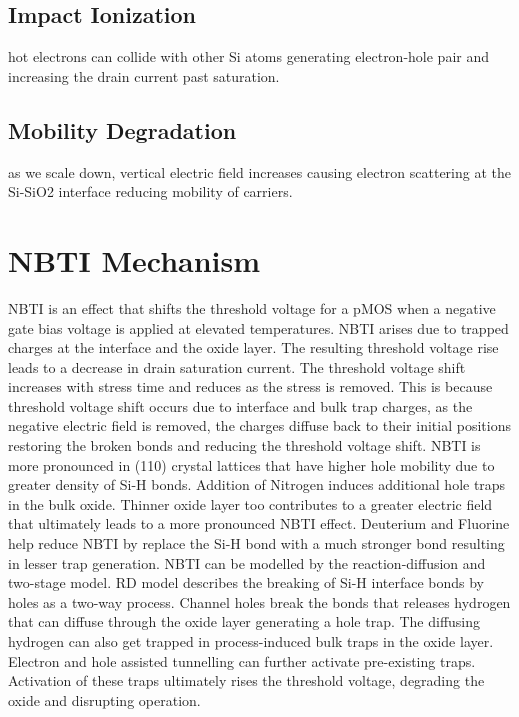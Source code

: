 \subsection{Impact Ionization}
hot electrons can collide with other Si atoms generating electron-hole pair and increasing the drain current past saturation. 
\subsection{Mobility Degradation}
as we scale down, vertical electric field increases causing electron scattering at the Si-SiO2 interface reducing mobility of carriers.
\section{NBTI Mechanism}
NBTI is an effect that shifts the threshold voltage for a pMOS when a negative gate bias voltage is applied at elevated temperatures. NBTI arises due to trapped charges at the interface and the oxide layer. The resulting threshold voltage rise leads to a decrease in drain saturation current. The threshold voltage shift increases with stress time and reduces as the stress is removed. This is because threshold voltage shift occurs due to interface and bulk trap charges, as the negative electric field is removed, the charges diffuse back to their initial positions restoring the broken bonds and reducing the threshold voltage shift.
NBTI is more pronounced in (110) crystal lattices that have higher hole mobility due to greater density of Si-H bonds. Addition of Nitrogen induces additional hole traps in the bulk oxide. Thinner oxide layer too contributes to a greater electric field that ultimately leads to a more pronounced NBTI effect. Deuterium and Fluorine help reduce NBTI by replace the Si-H bond with a much stronger bond resulting in lesser trap generation. NBTI can be modelled by the reaction-diffusion and two-stage model. RD model describes the breaking of Si-H interface bonds by holes as a two-way process. Channel holes break the bonds that releases hydrogen that can diffuse through the oxide layer generating a hole trap. The diffusing hydrogen can also get trapped in process-induced bulk traps in the oxide layer. Electron and hole assisted tunnelling can further activate pre-existing traps. Activation of these traps ultimately rises the threshold voltage, degrading the oxide and disrupting operation.

